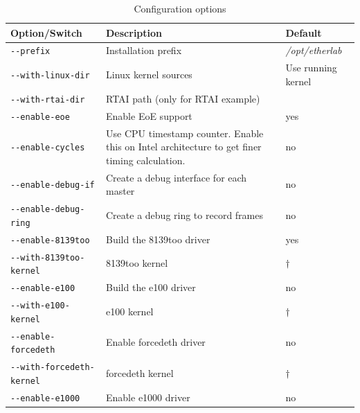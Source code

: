 \documentclass[a4paper,12pt,BCOR6mm,bibtotoc,idxtotoc]{scrbook}
\begin{document}
\begin{table}
  \caption{Configuration options}
  \label{tab:config}
  \vspace{2mm}
  \begin{tabular}{l|p{}|l}

\bf Option/Switch & \bf Description & \bf Default\\\hline

\lstinline+--prefix+ & Installation prefix & \textit{/opt/etherlab}\\

\lstinline+--with-linux-dir+ & Linux kernel sources & Use running kernel\\

\lstinline+--with-rtai-dir+ & RTAI path (only for RTAI example) & \\

\hline

\lstinline+--enable-eoe+ & Enable EoE support & yes\\

\lstinline+--enable-cycles+ & Use CPU timestamp counter. Enable this on Intel
architecture to get finer timing calculation. & no\\

\lstinline+--enable-debug-if+ & Create a debug interface for each master & no\\

\lstinline+--enable-debug-ring+ & Create a debug ring to record frames & no\\

\hline

\lstinline+--enable-8139too+ & Build the 8139too driver & yes\\

\lstinline+--with-8139too-kernel+ & 8139too kernel & $\dagger$\\

\lstinline+--enable-e100+ & Build the e100 driver & no\\

\lstinline+--with-e100-kernel+ & e100 kernel & $\dagger$\\

\lstinline+--enable-forcedeth+ & Enable forcedeth driver & no\\

\lstinline+--with-forcedeth-kernel+ & forcedeth kernel & $\dagger$\\

\lstinline+--enable-e1000+ & Enable e1000 driver & no\\


\end{tabular}
\end{table}
\end{document}
